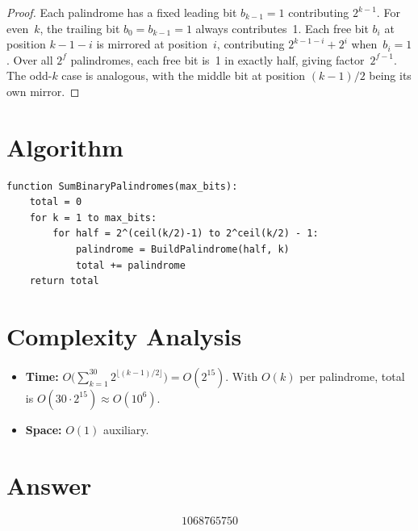 \documentclass[11pt]{article}
\theoremstyle{definition}
\begin{document}
\begin{proof}
Each palindrome has a fixed leading bit $b_{k-1}=1$ contributing $2^{k-1}$. For even~$k$, the trailing bit $b_0 = b_{k-1}=1$ always contributes~1. Each free bit $b_i$ at position $k-1-i$ is mirrored at position~$i$, contributing $2^{k-1-i}+2^i$ when~$b_i=1$. Over all $2^f$ palindromes, each free bit is~1 in exactly half, giving factor~$2^{f-1}$. The odd-$k$ case is analogous, with the middle bit at position $(k-1)/2$ being its own mirror.
\end{proof}

\section{Algorithm}

\begin{verbatim}
function SumBinaryPalindromes(max_bits):
    total = 0
    for k = 1 to max_bits:
        for half = 2^(ceil(k/2)-1) to 2^ceil(k/2) - 1:
            palindrome = BuildPalindrome(half, k)
            total += palindrome
    return total
\end{verbatim}

\section{Complexity Analysis}

\begin{itemize}
\item \textbf{Time:} $O\!\bigl(\sum_{k=1}^{30} 2^{\lfloor(k-1)/2\rfloor}\bigr) = O(2^{15})$. With $O(k)$ per palindrome, total is $O(30 \cdot 2^{15}) \approx O(10^6)$.
\item \textbf{Space:} $O(1)$ auxiliary.
\end{itemize}

\section{Answer}

\[
\boxed{1068765750}
\]
\end{document}
